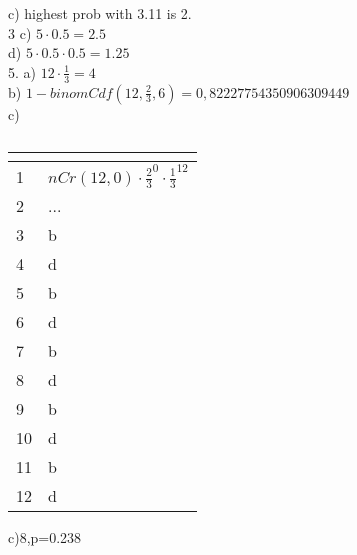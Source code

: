 \documentclass{article}
\begin{document}
  c) highest prob with 3.11 is 2.\\
  3 c) $5\cdot0.5=2.5$\\
  d) $5\cdot0.5\cdot0.5=1.25$\\
  5. a) $12\cdot\frac{1}{3}=4$\\
  b) $1-binomCdf(12,\frac{2}{3},6)=0,82227754350906309449$\\
  c)
  \begin{table}
    \caption{}\label{tab:}
    \begin{center}
      \begin{tabular}[c]{l|l}
        \hline
        \multicolumn{1}{c|}{\textbf{}} & 
        \multicolumn{1}{c}{\textbf{}} \\
        \hline
        1 & $nCr(12,0)\cdot\frac{2}{3}^0\cdot\frac{1}{3}^{12}$\\
        2 & ...  \\
        3 & b \\
        4 & d \\
        5 & b \\
        6 & d \\
        7 & b \\
        8 & d \\
        9 & b \\
        10 & d \\
        11 & b \\
        12 & d \\

        \hline
      \end{tabular}
    \end{center}
  \end{table}
  c)8,p=0.238\\


   
\end{document}
